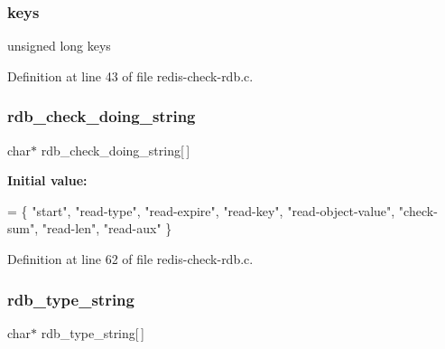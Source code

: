 \mbox{\label{redis-check-rdb_8c_a1f3b6698ca8496c05e0c9c0d56cb36ac}} 
\subsubsection{\texorpdfstring{keys}{keys}}
{\footnotesize\ttfamily unsigned long keys}



Definition at line 43 of file redis-\/check-\/rdb.\+c.

\mbox{\label{redis-check-rdb_8c_a390c5cddbb415181b1c83215104ec76a}} 
\subsubsection{\texorpdfstring{rdb\+\_\+check\+\_\+doing\+\_\+string}{rdb\_check\_doing\_string}}
{\footnotesize\ttfamily char$\ast$ rdb\+\_\+check\+\_\+doing\+\_\+string\mbox{[}$\,$\mbox{]}}

{\bfseries Initial value\+:}
\begin{DoxyCode}
= \{
    \textcolor{stringliteral}{"start"},
    \textcolor{stringliteral}{"read-type"},
    \textcolor{stringliteral}{"read-expire"},
    \textcolor{stringliteral}{"read-key"},
    \textcolor{stringliteral}{"read-object-value"},
    \textcolor{stringliteral}{"check-sum"},
    \textcolor{stringliteral}{"read-len"},
    \textcolor{stringliteral}{"read-aux"}
\}
\end{DoxyCode}


Definition at line 62 of file redis-\/check-\/rdb.\+c.

\mbox{\label{redis-check-rdb_8c_a000e9bf752f761afff27c2de885a868e}} 
\subsubsection{\texorpdfstring{rdb\+\_\+type\+\_\+string}{rdb\_type\_string}}
{\footnotesize\ttfamily char$\ast$ rdb\+\_\+type\+\_\+string\mbox{[}$\,$\mbox{]}}

